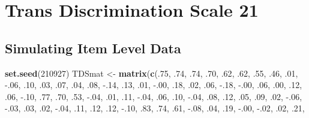 \documentclass[
  english,
]{book}
\newenvironment{Shaded}{\begin{snugshade}}{\end{snugshade}}
\newcommand{\DecValTok}[1]{\textcolor[rgb]{0.00,0.00,0.81}{#1}}
\newcommand{\FloatTok}[1]{\textcolor[rgb]{0.00,0.00,0.81}{#1}}
\newcommand{\KeywordTok}[1]{\textcolor[rgb]{0.13,0.29,0.53}{\textbf{#1}}}
\newcommand{\NormalTok}[1]{#1}
\newcommand{\StringTok}[1]{\textcolor[rgb]{0.31,0.60,0.02}{#1}}
\begin{document}
\hypertarget{trans-discrimination-scale-21}{%
\section{Trans Discrimination Scale 21}\label{trans-discrimination-scale-21}}

\hypertarget{simulating-item-level-data-1}{%
\subsection{Simulating Item Level Data}\label{simulating-item-level-data-1}}

\begin{Shaded}
\begin{Highlighting}[]
\KeywordTok{set.seed}\NormalTok{(}\DecValTok{210927}\NormalTok{)}
\NormalTok{TDSmat <-}\StringTok{ }\KeywordTok{matrix}\NormalTok{(}\KeywordTok{c}\NormalTok{(.}\DecValTok{75}\NormalTok{, }\FloatTok{.74}\NormalTok{, }\FloatTok{.74}\NormalTok{, }\FloatTok{.70}\NormalTok{, }\FloatTok{.62}\NormalTok{, }\FloatTok{.62}\NormalTok{, }\FloatTok{.55}\NormalTok{, }\FloatTok{.46}\NormalTok{, }\FloatTok{.01}\NormalTok{, }\FloatTok{-.06}\NormalTok{, }\FloatTok{.10}\NormalTok{, }\FloatTok{.03}\NormalTok{, }\FloatTok{.07}\NormalTok{, }\FloatTok{.04}\NormalTok{, }\FloatTok{.08}\NormalTok{, }\FloatTok{-.14}\NormalTok{, }\FloatTok{.13}\NormalTok{, }\FloatTok{.01}\NormalTok{, }\FloatTok{-.00}\NormalTok{, }\FloatTok{.18}\NormalTok{, }\FloatTok{.02}\NormalTok{,}
                   \FloatTok{.06}\NormalTok{, }\FloatTok{-.18}\NormalTok{, }\FloatTok{-.00}\NormalTok{, }\FloatTok{.06}\NormalTok{, }\FloatTok{.00}\NormalTok{, }\FloatTok{.12}\NormalTok{, }\FloatTok{.06}\NormalTok{, }\FloatTok{-.10}\NormalTok{, }\FloatTok{.77}\NormalTok{, }\FloatTok{.70}\NormalTok{, }\FloatTok{.53}\NormalTok{, }\FloatTok{-.04}\NormalTok{, }\FloatTok{.01}\NormalTok{, }\FloatTok{.11}\NormalTok{, }\FloatTok{-.04}\NormalTok{, }\FloatTok{.06}\NormalTok{, }\FloatTok{.10}\NormalTok{, }\FloatTok{-.04}\NormalTok{, }\FloatTok{.08}\NormalTok{, }\FloatTok{.12}\NormalTok{, }\FloatTok{.05}\NormalTok{,}
                   \FloatTok{.09}\NormalTok{, }\FloatTok{.02}\NormalTok{, }\FloatTok{-.06}\NormalTok{, }\FloatTok{-.03}\NormalTok{, }\FloatTok{.03}\NormalTok{, }\FloatTok{.02}\NormalTok{, }\FloatTok{-.04}\NormalTok{, }\FloatTok{.11}\NormalTok{, }\FloatTok{.12}\NormalTok{, }\FloatTok{.12}\NormalTok{, }\FloatTok{-.10}\NormalTok{, }\FloatTok{.83}\NormalTok{, }\FloatTok{.74}\NormalTok{, }\FloatTok{.61}\NormalTok{, }\FloatTok{-.08}\NormalTok{, }\FloatTok{.04}\NormalTok{, }\FloatTok{.19}\NormalTok{, }\FloatTok{-.00}\NormalTok{, }\FloatTok{-.02}\NormalTok{, }\FloatTok{.02}\NormalTok{, }\FloatTok{.21}\NormalTok{,}

\end{Highlighting}
\end{Shaded}
\end{document}
